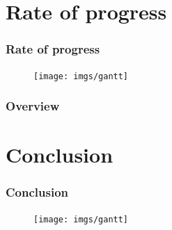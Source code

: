 \documentclass{beamer}
\begin{document}
\section{Rate of progress}
\begin{frame}
\frametitle{Rate of progress}
\begin{figure}
\centering
\texttt{[image: imgs/gantt]}
\end{figure}
\end{frame}

\begin{frame}
\frametitle{Overview} %
\tableofcontents %
\end{frame}
\section{Conclusion}
\begin{frame}
\frametitle{Conclusion}
\begin{figure}
\centering
\texttt{[image: imgs/gantt]}
\end{figure}
\end{frame}




\end{document}
